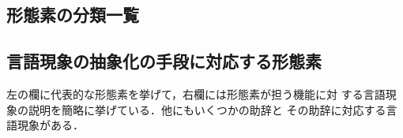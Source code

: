 \setcounter{figure}{0}
\setcounter{table}{0}

\appendix
\small

\subsection*{形態素の分類一覧}
\bfg
{}

\subsection*{言語現象の抽象化の手段に対応する形態素}

左の欄に代表的な形態素を挙げて，右欄には形態素が担う機能に対
する言語現象の説明を簡略に挙げている．他にもいくつかの助辞と
その助辞に対応する言語現象がある．

